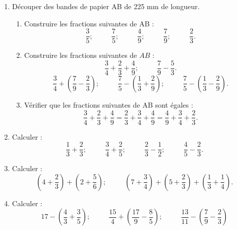 \documentclass[12 pt]{report}
\theoremstyle{plain}
\newcounter{n}
\begin{document}
\begin{enumerate}
\item Découper des bandes de papier AB de 225 mm de 
longueur. \begin{enumerate}
\item Construire les fractions suivantes de AB : 
\[ \frac35; \phantom{meow}\frac75; \phantom{meow}
\frac49; \phantom{meow}\frac79; \phantom{meow}\frac23.\]
\item Construire les fractions suivantes de $AB$ : 
\[\frac34+\frac23+\frac49; \phantom{meow}\frac79-\frac53.\]
\[\frac34+\left(\frac79-\frac23\right);  \phantom{meow} \frac75-\left(\frac13+\frac29\right);
 \phantom{meow}\frac75-\left(\frac13-\frac29\right).\]
 
 \item Vérifier que les fractions suivantes de AB sont égales : 
 \[\frac34+\frac23+\frac49 = \frac23+\frac34+\frac49 = \frac49 + \frac34 + \frac23.\]
 \end{enumerate}
 \item Calculer : 
 \[\frac13 + \frac23;  \phantom{meow}
 \frac34+\frac25; \phantom{meow}
 \frac23-\frac12;  \phantom{meow}
 \frac45-\frac23.\]
 \item Calculer : \[\left(4+\frac23\right) + \left(2+ \frac56\right);  \phantom{meow}
 \left(7 + \frac34\right) + \left(5 + \frac23\right)
 + \left(\frac13+\frac14\right).\]
 \item Calculer :\[ 17 - \left(\frac43 + \frac35\right) ;  \phantom{meow}
 \frac{15}4 + \left(\frac{17}9-\frac85\right); 
  \phantom{meow}
  \frac{13}{11} - \left(\frac79 - \frac23\right)\]


\end{enumerate}
\end{document}
